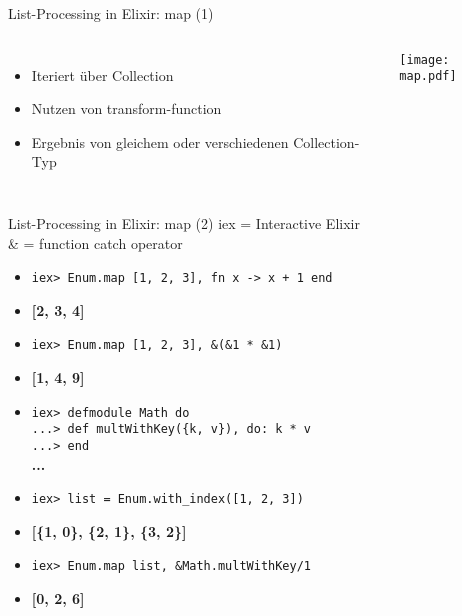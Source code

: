 \documentclass[compress]{beamer}
\begin{document}
  \begin{frame}{List-Processing in Elixir: map (1)}
    \begin{columns}[c]
      \begin{itemize}
        \item Iteriert über Collection
        \item Nutzen von transform-function
        \item Ergebnis von gleichem oder verschiedenen Collection-Typ
      \end{itemize}
    \texttt{[image: map.pdf]}
    \end{columns}
  \end{frame}
  

  \begin{frame}{List-Processing in Elixir: map (2)}
    iex = Interactive Elixir \\
    \& = function catch operator
    \begin{itemize}[<+->]
    \item
      \texttt{iex> Enum.map [1, 2, 3], fn x -> x + 1 end} \\
    \item
      \textbf{[2, 3, 4]} \\
    \item
      \texttt{iex> Enum.map [1, 2, 3], \&(\&1 * \&1)} \\
    \item
      \textbf{[1, 4, 9]} \\
    \item
      \texttt{iex> defmodule Math do \\
            ...> def multWithKey(\{k, v\}), do: k * v \\
            ...> end\\
      }
      \textbf{...} \\
    \item
      \texttt{iex> list = Enum.with\_index([1, 2, 3])} \\
    \item
      \textbf{[\{1, 0\}, \{2, 1\}, \{3, 2\}]} \\
    \item
      \texttt{iex> Enum.map list, \&Math.multWithKey/1} \\
    \item
      \textbf{[0, 2, 6]} \\
    \end{itemize}
  \end{frame}
\end{document}
